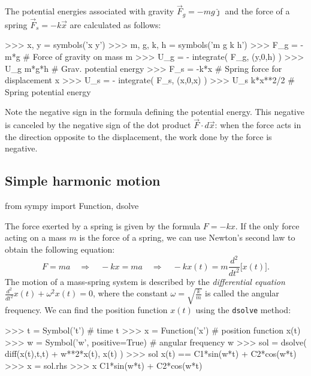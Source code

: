The potential energies associated with gravity $\vec{F}_g = -mg\hat{\jmath}$						
and the force of a spring $\vec{F}_s = -k\vec{x}$ are calculated as follows:						

\small
\begin{verbatimtab}
>>> x, y = symbols('x y')
>>> m, g, k, h = symbols('m g k h')
>>> F_g = -m*g             # Force of gravity on mass m 
>>> U_g = - integrate( F_g, (y,0,h) )
>>> U_g
m*g*h                      # Grav. potential energy 
>>> F_s = -k*x             # Spring force for displacement x 
>>> U_s = - integrate( F_s, (x,0,x) )
>>> U_s
k*x**2/2                   # Spring potential energy 
\end{verbatimtab}
\normalsize

\noindent
Note the negative sign in the formula defining the potential energy.
This negative is canceled by the negative sign of the dot product $\vec{F}\cdot d\vec{x}$:
when the force acts in the direction opposite to the displacement, 
the work done by the force is negative.

\subsection{Simple harmonic motion}
\label{mechanics:simple_harmonic_motion}
\small
\begin{verbatimtab}
from sympy import Function, dsolve
\end{verbatimtab}
\normalsize

\noindent
The force exerted by a spring is given by the formula $F=-kx$.
If the only force acting on a mass $m$ is the force of a spring,
we can use Newton's second law to obtain the following equation:
\[
  F=ma  
  \quad \Rightarrow \quad
  -kx = ma   
  \quad \Rightarrow \quad
  -kx(t) = m\frac{d^2}{dt^2}\Big[x(t)\Big].
\]
The motion of a mass-spring system is described by the \emph{differential equation} $\frac{d^2}{dt^2}x(t) + \omega^2 x(t)=0$,
where the constant $\omega = \sqrt{\frac{k}{m}}$ is called the angular frequency.
We can find the position function $x(t)$ using the \texttt{dsolve} method:

\small
\begin{verbatimtab}
>>> t = Symbol('t')                   # time            t
>>> x = Function('x')                 # position function x(t)
>>> w = Symbol('w', positive=True)    # angular frequency w
>>> sol = dsolve( diff(x(t),t,t) + w**2*x(t), x(t) )
>>> sol
x(t) == C1*sin(w*t) + C2*cos(w*t)  
>>> x = sol.rhs           
>>> x 
C1*sin(w*t) + C2*cos(w*t)
\end{verbatimtab}
\normalsize

